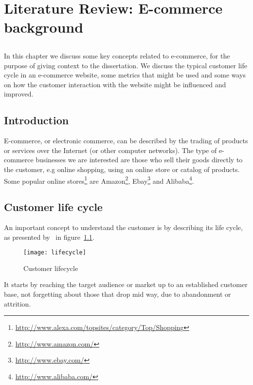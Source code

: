 \chapter{Literature Review: E-commerce background} \label{chap:ecommerce}

\section*{}

In this chapter we discuss some key concepts related to e-commerce, for the 
purpose of giving context to the dissertation. We discuss the typical customer 
life cycle in an e-commerce website, some metrics that might be used and some 
ways on how the customer interaction with the website might be influenced and 
improved.

\section{Introduction}

E-commerce, or electronic commerce, can be described by the trading of products 
or services over the Internet (or other computer networks). The type of 
e-commerce businesses we are interested are those who sell their goods directly 
to the customer, e.g online shopping, using an online store or catalog of 
products. Some popular online 
stores\footnote{\url{http://www.alexa.com/topsites/category/Top/Shopping}} are 
Amazon\footnote{\url{http://www.amazon.com/}}, 
Ebay\footnote{\url{http://www.ebay.com/}} and 
Alibaba\footnote{\url{http://www.alibaba.com/}}.

\section{Customer life cycle}

An important concept to understand the customer is by describing its life 
cycle, as presented by~\cite[Section 6]{Sterne2000} in 
figure~\ref{fig:lifecycle}.

\begin{figure}[h]
  \begin{center}
    \leavevmode
    \texttt{[image: lifecycle]}
    \caption{Customer lifecycle \cite{Sterne2000}}
    \label{fig:lifecycle}
  \end{center}
\end{figure}

It starts by reaching the target audience or market up to an established 
customer base, not forgetting about those that drop mid way, due to abandonment 
or attrition.


